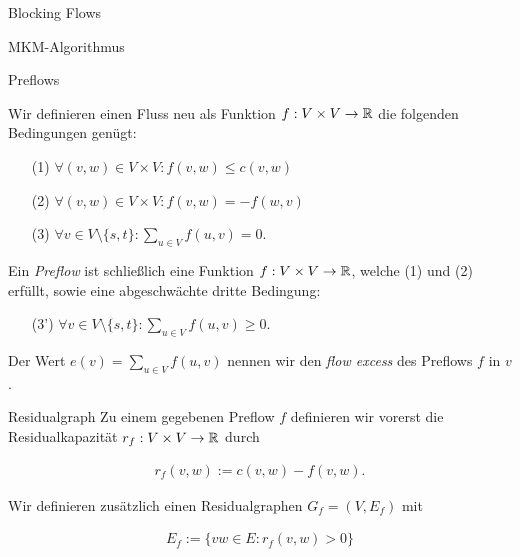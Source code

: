 \documentclass[aspectratio=169]{beamer}
\begin{document}
\begin{frame}{Blocking Flows}

\end{frame}


\begin{frame}{MKM-Algorithmus}
  
\end{frame}

\begin{frame}{Preflows}
  
  Wir definieren einen Fluss neu als 
  Funktion $f: V \times V \to \mathbb{R}$ die folgenden Bedingungen genügt:

  \begin{enumerate}
    \item[(1)] $\forall (v,w) \in V \times V: f(v,w) \leq c(v,w)$
    \item[(2)] $\forall (v,w) \in V \times V: f(v,w) = -f(w,v)$
    \item[(3)] $\forall v \in V \setminus \{s, t\}: \sum_{u \in V} f(u, v) = 0$.
  \end{enumerate}

  Ein \textit{Preflow} ist schließlich eine Funktion $f: V \times V \to \mathbb{R}$,
  welche (1) und (2) erfüllt, sowie eine abgeschwächte dritte Bedingung:

  \begin{enumerate}
    \item[(3')] $\forall v \in V \setminus \{s, t\}: \sum_{u \in V} f(u, v) \geq 0$.
  \end{enumerate}

  Der Wert $e(v) = \sum_{u \in V} f(u,v)$ nennen wir den \textit{flow excess}
  des Preflows $f$ in $v$.

\end{frame}

\begin{frame}{Residualgraph}
  Zu einem gegebenen Preflow $f$ definieren wir vorerst die Residualkapazität
  $r_f: V \times V \to \mathbb{R}$ durch

  \begin{align*}
    r_f(v,w) := c(v,w) - f(v,w).
  \end{align*}

  Wir definieren zusätzlich einen Residualgraphen $G_f = (V,E_f)$ mit

  \begin{align*}
    E_f := \{ vw \in E: r_f(v,w) > 0\}
  \end{align*}

\end{frame}
\end{document}
